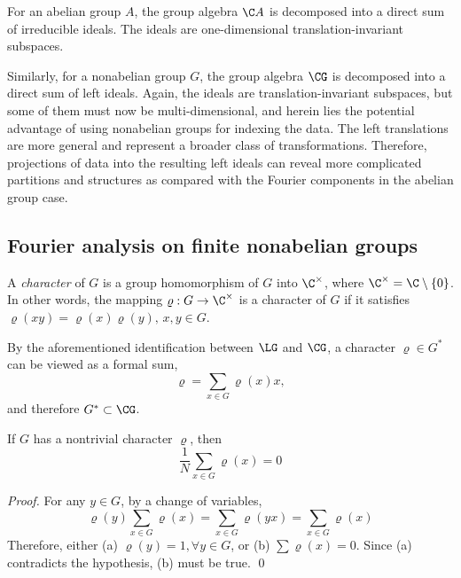 For an abelian group $A$, the group algebra $\C A$ is
decomposed into a direct sum of irreducible ideals.  The
ideals are one-dimensional translation-invariant subspaces.  


Similarly, for a nonabelian group $G$, the group algebra
$\CG$ is decomposed into a direct sum of left ideals.
Again, the ideals are translation-invariant
subspaces, but some of them must now be multi-dimensional,
and herein lies the potential advantage of using nonabelian
groups for indexing the data. The left translations
are more general and represent a broader class of 
transformations. Therefore, projections of data into the
resulting left ideals can reveal more complicated partitions
and structures as compared with the Fourier components in
the abelian group case. 


\subsection{Fourier analysis on finite nonabelian groups}
A \emph{character} of $G$ is a group homomorphism of $G$
into $\C^{\times}$, where $\C^{\times} = \C \setminus \{0\}$.
In other words, the mapping $\varrho: G \to \C^{\times}$ is a character of
$G$ if it satisfies $\varrho(xy) = \varrho(x)\varrho(y), \, x, y \in G$.

By the aforementioned identification between $\LG$ and
$\CG$, a character $\varrho \in G^*$ can be viewed as a formal sum,
\begin{equation}\label{eq:GFIP-formal-sumA}
\varrho = \sum_{x\in G}\varrho(x)x,
\end{equation}
and therefore $G^* \subset \CG$.

%
\begin{theorem}
If $G$ has a nontrivial character $\varrho$, then
\[
\frac{1}{N} \sum_{x\in G} \varrho(x) = 0
\]
\end{theorem}
\begin{proof}
For any $y\in G$, by a change of variables,
\[
\varrho(y) \sum_{x\in G} \varrho(x) = \sum_{x\in G} \varrho(yx) = \sum_{x\in G} \varrho(x)
\]
Therefore, either (a) $\varrho(y)=1, \forall y\in G$, or (b) $\sum \varrho(x)=0$.
Since (a) contradicts the hypothesis, (b) must be true. \qed
\end{proof}

